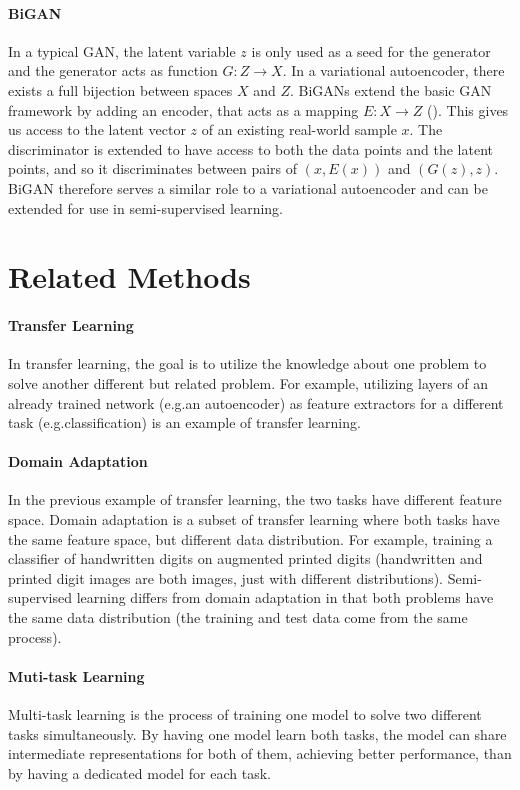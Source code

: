 \paragraph*{BiGAN}
In a typical GAN, the latent variable $z$ is only used as a seed for the generator and the generator acts as function $G: Z \rightarrow X$. In a variational autoencoder, there exists a full bijection between spaces $X$ and $Z$. BiGANs extend the basic GAN framework by adding an encoder, that acts as a mapping $E: X \rightarrow Z$ (\cite{BiGAN}). This gives us access to the latent vector $z$ of an existing real-world sample $x$. The discriminator is extended to have access to both the data points and the latent points, and so it discriminates between pairs of $(x, E(x))$ and $(G(z), z)$. BiGAN therefore serves a similar role to a variational autoencoder and can be extended for use in semi-supervised learning.


\section{Related Methods}
\label{sec:RelatedSslMethods}

\paragraph*{Transfer Learning} In transfer learning, the goal is to utilize the knowledge about one problem to solve another different but related problem. For example, utilizing layers of an already trained network (e.g.\@ an autoencoder) as feature extractors for a different task (e.g.\@ classification) is an example of transfer learning.

\paragraph*{Domain Adaptation} In the previous example of transfer learning, the two tasks have different feature space. Domain adaptation is a subset of transfer learning where both tasks have the same feature space, but different data distribution. For example, training a classifier of handwritten digits on augmented printed digits (handwritten and printed digit images are both images, just with different distributions). Semi-supervised learning differs from domain adaptation in that both problems have the same data distribution (the training and test data come from the same process).

\paragraph*{Muti-task Learning} Multi-task learning is the process of training one model to solve two different tasks simultaneously. By having one model learn both tasks, the model can share intermediate representations for both of them, achieving better performance, than by having a dedicated model for each task.
